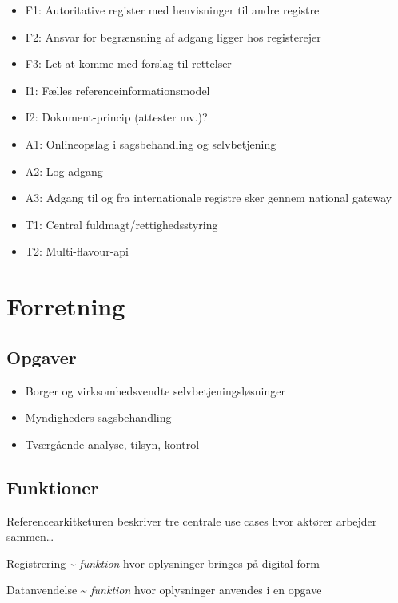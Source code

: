 \begin{itemize}
\tightlist
\item
  F1: Autoritative register med henvisninger til andre registre
\item
  F2: Ansvar for begrænsning af adgang ligger hos registerejer
\item
  F3: Let at komme med forslag til rettelser
\item
  I1: Fælles referenceinformationsmodel
\item
  I2: Dokument-princip (attester mv.)?
\item
  A1: Onlineopslag i sagsbehandling og selvbetjening
\item
  A2: Log adgang
\item
  A3: Adgang til og fra internationale registre sker gennem national
  gateway
\item
  T1: Central fuldmagt/rettighedsstyring
\item
  T2: Multi-flavour-api
\end{itemize}

\section{Forretning}\label{forretning}

\subsection{Opgaver}\label{opgaver}

\begin{itemize}
\tightlist
\item
  Borger og virksomhedsvendte selvbetjeningsløsninger
\item
  Myndigheders sagsbehandling
\item
  Tværgående analyse, tilsyn, kontrol
\end{itemize}

\subsection{Funktioner}\label{funktioner}

Referencearkitketuren beskriver tre centrale use cases hvor aktører
arbejder sammen\ldots{}

Registrering \textasciitilde{} \emph{funktion} hvor oplysninger bringes
på digital form

Datanvendelse \textasciitilde{} \emph{funktion} hvor oplysninger
anvendes i en opgave

